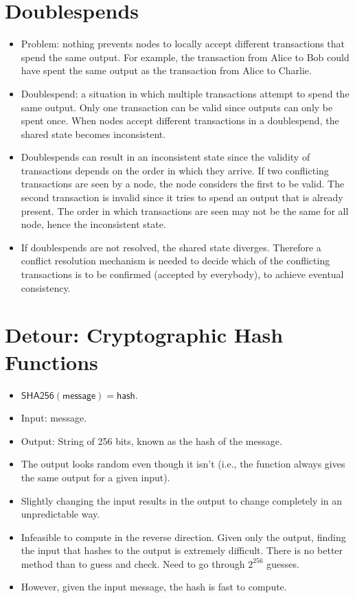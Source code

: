 \documentclass{article}
\begin{document}
\section{Doublespends}

\begin{itemize}
  \item Problem: nothing prevents nodes to locally accept different transactions
    that spend the same output. For example, the transaction from Alice to Bob
    could have spent the same output as the transaction from Alice to Charlie.
  \item Doublespend: a situation in which multiple transactions attempt to spend
    the same output. Only one transaction can be valid since outputs can only be
    spent once. When nodes accept different transactions in a doublespend, the
    shared state becomes inconsistent.
  \item Doublespends can result in an inconsistent state since the validity of
    transactions depends on the order in which they arrive. If two conflicting
    transactions are seen by a node, the node considers the first to be valid.
    The second transaction is invalid since it tries to spend an output that is
    already present. The order in which transactions are seen may not be the
    same for all node, hence the inconsistent state.
  \item If doublespends are not resolved, the shared state diverges. Therefore a
    conflict resolution mechanism is needed to decide which of the conflicting
    transactions is to be confirmed (accepted by everybody), to achieve eventual
    consistency.
\end{itemize}

\section{Detour: Cryptographic Hash Functions}

\begin{itemize}
  \item $\mathsf{SHA256(message) = hash}$.
  \item Input: message.
  \item Output: String of 256 bits, known as the hash of the message.
  \item The output looks random even though it isn't (i.e., the function always
    gives the same output for a given input).
  \item Slightly changing the input results in the output to change completely
    in an unpredictable way.
  \item Infeasible to compute in the reverse direction. Given only the output,
    finding the input that hashes to the output is extremely difficult. There is
    no better method than to guess and check. Need to go through $2^{256}$
    guesses.
  \item However, given the input message, the hash is fast to compute.
\end{itemize}
\end{document}
